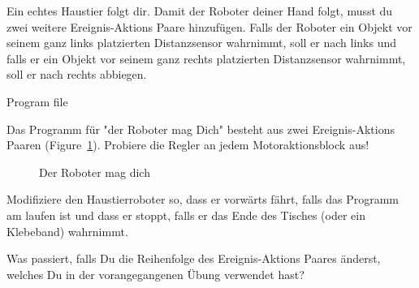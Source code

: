 
Ein echtes Haustier folgt dir.
Damit der Roboter deiner Hand folgt,
musst du zwei weitere Ereignis-Aktions Paare hinzufügen.
Falls der Roboter ein Objekt vor seinem
ganz links platzierten Distanzsensor wahrnimmt,
soll er nach links und falls er ein Objekt
vor seinem ganz rechts platzierten Distanzsensor wahrnimmt, soll er nach rechts abbiegen.

{\raggedleft \hfill Program file }

Das Programm für "der Roboter mag Dich" besteht aus zwei Ereignis-Aktions Paaren
(Figure~\ref{fig.likes}).
Probiere die Regler an jedem Motoraktionsblock aus!

\begin{figure}
\begin{center}
\caption{Der Roboter mag dich}
\label{fig.likes}
\end{center}
\end{figure}


Modifiziere den Haustierroboter so,
dass er vorwärts fährt, falls das Programm am laufen ist
und dass er stoppt, falls er das Ende des Tisches (oder ein Klebeband) wahrnimmt.


Was passiert, falls Du die Reihenfolge des Ereignis-Aktions Paares änderst, 
welches Du in der vorangegangenen Übung verwendet hast?


